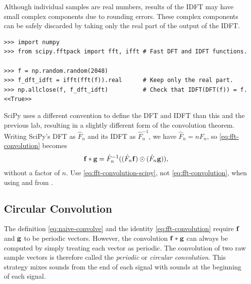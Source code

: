 \begin{info} %
Although individual samples are real numbers, results of the IDFT may have small complex components due to rounding errors.
These complex components can be safely discarded by taking only the real part of the output of the IDFT.

\begin{lstlisting}
>>> import numpy
>>> from scipy.fftpack import fft, ifft # Fast DFT and IDFT functions.

>>> f = np.random.random(2048)
>>> f_dft_idft = ifft(fft(f)).real      # Keep only the real part.
>>> np.allclose(f, f_dft_idft)          # Check that IDFT(DFT(f)) = f.
<<True>>
\end{lstlisting}
\end{info}

\begin{warn} %
SciPy uses a different convention to define the DFT and IDFT than this and the previous lab, resulting in a slightly different form of the convolution theorem.
Writing SciPy's DFT as $\hat{F}_n$ and its IDFT as $\hat{F}_n^{-1}$, we have $\hat{F}_n = n F_n$, so \eqref{eq:fft-convolution} becomes
\begin{align}
\mathbf{f} \ast \mathbf{g} = \hat{F}_n^{-1}((\hat{F}_n\mathbf{f})\odot (\hat{F}_n\mathbf{g})),
\label{eq:fft-convolution-scipy}
\end{align}
without a factor of $n$.
Use \eqref{eq:fft-convolution-scipy}, not \eqref{eq:fft-convolution}, when using  and  from .
\end{warn}

\subsection*{Circular Convolution} %

The definition \eqref{eq:naive-convolve} and the identity \eqref{eq:fft-convolution} require $\mathbf{f}$ and $\mathbf{g}$ to be periodic vectors.
However, the convolution $\mathbf{f} \ast \mathbf{g}$ can always be computed by simply treating each vector as periodic.
The convolution of two raw sample vectors is therefore called the \emph{periodic} or \emph{circular convolution}.
This strategy mixes sounds from the end of each signal with sounds at the beginning of each signal.

